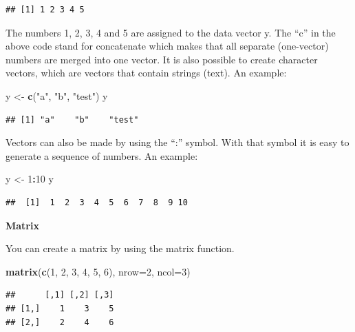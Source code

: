 \documentclass[]{book}
\newenvironment{Shaded}{\begin{snugshade}}{\end{snugshade}}
\newcommand{\KeywordTok}[1]{\textcolor[rgb]{0.13,0.29,0.53}{\textbf{#1}}}
\newcommand{\DataTypeTok}[1]{\textcolor[rgb]{0.13,0.29,0.53}{#1}}
\newcommand{\DecValTok}[1]{\textcolor[rgb]{0.00,0.00,0.81}{#1}}
\newcommand{\StringTok}[1]{\textcolor[rgb]{0.31,0.60,0.02}{#1}}
\newcommand{\OperatorTok}[1]{\textcolor[rgb]{0.81,0.36,0.00}{\textbf{#1}}}
\newcommand{\NormalTok}[1]{#1}
\begin{document}
\begin{verbatim}
## [1] 1 2 3 4 5
\end{verbatim}

The numbers 1, 2, 3, 4 and 5 are assigned to the data vector y. The
``c'' in the above code stand for concatenate which makes that all
separate (one-vector) numbers are merged into one vector. It is also
possible to create character vectors, which are vectors that contain
strings (text). An example:

\begin{Shaded}
\begin{Highlighting}[]
\NormalTok{y <-}\StringTok{ }\KeywordTok{c}\NormalTok{(}\StringTok{"a"}\NormalTok{, }\StringTok{"b"}\NormalTok{, }\StringTok{"test"}\NormalTok{)}
\NormalTok{y}
\end{Highlighting}
\end{Shaded}

\begin{verbatim}
## [1] "a"    "b"    "test"
\end{verbatim}

Vectors can also be made by using the ``:'' symbol. With that symbol it
is easy to generate a sequence of numbers. An example:

\begin{Shaded}
\begin{Highlighting}[]
\NormalTok{y <-}\StringTok{ }\DecValTok{1}\OperatorTok{:}\DecValTok{10}
\NormalTok{y}
\end{Highlighting}
\end{Shaded}

\begin{verbatim}
##  [1]  1  2  3  4  5  6  7  8  9 10
\end{verbatim}

\textbf{Matrix}

You can create a matrix by using the matrix function.

\begin{Shaded}
\begin{Highlighting}[]
\KeywordTok{matrix}\NormalTok{(}\KeywordTok{c}\NormalTok{(}\DecValTok{1}\NormalTok{, }\DecValTok{2}\NormalTok{, }\DecValTok{3}\NormalTok{, }\DecValTok{4}\NormalTok{, }\DecValTok{5}\NormalTok{, }\DecValTok{6}\NormalTok{), }\DataTypeTok{nrow=}\DecValTok{2}\NormalTok{, }\DataTypeTok{ncol=}\DecValTok{3}\NormalTok{)}
\end{Highlighting}
\end{Shaded}

\begin{verbatim}
##      [,1] [,2] [,3]
## [1,]    1    3    5
## [2,]    2    4    6
\end{verbatim}
\end{document}
